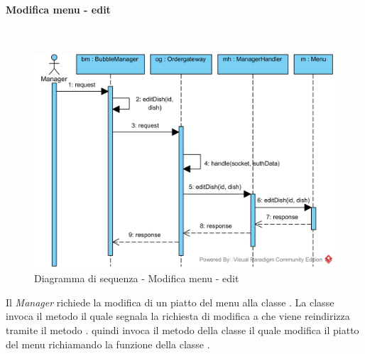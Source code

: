 \paragraph{Modifica menu - edit}\mbox{} \\
\nopagebreak
\begin{figure}[H]
	\centering
	\includegraphics[width=15cm]{./diagrammi/sequenza/modifica_menu_edit.png}
	\caption{Diagramma di sequenza - Modifica menu - edit}
\end{figure}
Il \textit{Manager} richiede la modifica di un piatto del menu alla classe . La classe invoca il metodo  il quale segnala la richiesta di modifica a  che viene reindirizza tramite il metodo .  quindi invoca il metodo  della classe  il quale modifica il piatto del menu richiamando la funzione  della classe .

